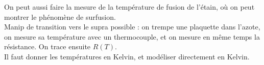 \documentclass[12pt,prb,aps,epsf]{article}
\begin{document}
On peut aussi faire la mesure de la température de fusion de l'étain, où on peut montrer le phénomène de surfusion.\\

Manip de transition vers le supra possible : on trempe une plaquette dans l'azote, on mesure sa température avec un thermocouple, et on mesure en même temps la résistance. On trace ensuite $R(T)$.\\

Il faut donner les températures en Kelvin, et modéliser directement en Kelvin.
\end{document}
